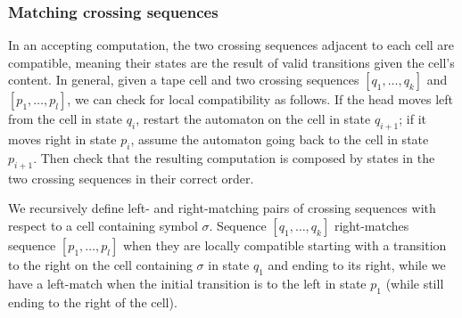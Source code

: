 \subsubsection{Matching crossing sequences}
In an accepting computation, the two crossing sequences adjacent to each cell are compatible, meaning their states are the result of valid transitions given the cell's content.
In general, given a tape cell and two crossing sequences $[q_1,\dots,q_k]$ and $[p_1,\dots,p_l]$, we can check for local compatibility as follows.
If the head moves left from the cell in state $q_i$, restart the automaton on the cell in state $q_{i+1}$; if it moves right in state $p_i$, assume the automaton going back to the cell in state $p_{i+1}$.
Then check that the resulting computation is composed by states in the two crossing sequences in their correct order.

We recursively define left- and right-matching pairs of crossing sequences with respect to a cell containing symbol $\sigma$.
Sequence $[q_1,\dots,q_k]$ right-matches sequence $[p_1,\dots,p_l]$ when they are locally compatible starting with a transition to the right on the cell containing $\sigma$ in state $q_1$ and ending to its right, while we have a left-match when the initial transition is to the left in state $p_1$ (while still ending to the right of the cell).


